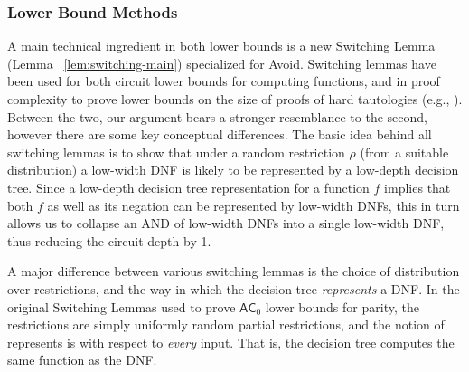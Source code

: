 \subsubsection{Lower Bound Methods}
 
A main technical ingredient in both lower bounds is a new Switching Lemma (Lemma ~\ref{lem:switching-main})  specialized for Avoid. 
Switching lemmas have been used for both circuit lower bounds for computing functions, and in proof complexity to prove lower bounds on the size of proofs of hard tautologies (e.g., \cite{beame-sl,razborov-sl,BeameIKPPW92}). Between the two, our argument bears a stronger resemblance to the second, however there are some key conceptual differences. 
The basic idea behind all switching lemmas is to show that under a random restriction $\rho$ (from a suitable distribution) a low-width DNF is likely to be represented by a low-depth decision tree. Since a low-depth decision tree representation for a function $f$ implies that both $f$ as well as its negation can be represented by low-width DNFs, this in turn allows us to collapse an AND of low-width DNFs into a single low-width DNF, thus reducing the circuit depth by 1.

A major difference between various switching lemmas is the choice of  distribution over restrictions, and the way in which the decision tree {\it represents} a DNF. In the original Switching Lemmas used to prove $\mathsf{AC}_0$ lower bounds for parity, the restrictions are simply uniformly random partial restrictions, and the notion of represents is with respect to {\it every} input. That is, the decision tree computes the same function as the DNF.


